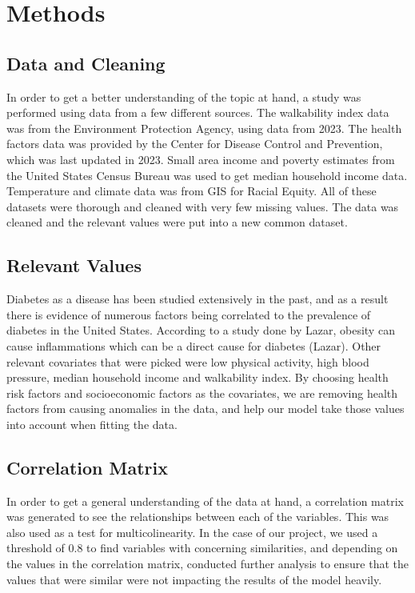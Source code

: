 \documentclass[
]{article}
\begin{document}
\section{Methods}\label{methods}

\subsection{Data and Cleaning}\label{data-and-cleaning}

In order to get a better understanding of the topic at hand, a study was
performed using data from a few different sources. The walkability index
data was from the Environment Protection Agency, using data from 2023.
The health factors data was provided by the Center for Disease Control
and Prevention, which was last updated in 2023. Small area income and
poverty estimates from the United States Census Bureau was used to get
median household income data. Temperature and climate data was from GIS
for Racial Equity. All of these datasets were thorough and cleaned with
very few missing values. The data was cleaned and the relevant values
were put into a new common dataset.

\subsection{Relevant Values}\label{relevant-values}

Diabetes as a disease has been studied extensively in the past, and as a
result there is evidence of numerous factors being correlated to the
prevalence of diabetes in the United States. According to a study done
by Lazar, obesity can cause inflammations which can be a direct cause
for diabetes (Lazar). Other relevant covariates that were picked were
low physical activity, high blood pressure, median household income and
walkability index. By choosing health risk factors and socioeconomic
factors as the covariates, we are removing health factors from causing
anomalies in the data, and help our model take those values into account
when fitting the data.

\subsection{Correlation Matrix}\label{correlation-matrix}

In order to get a general understanding of the data at hand, a
correlation matrix was generated to see the relationships between each
of the variables. This was also used as a test for multicolinearity. In
the case of our project, we used a threshold of 0.8 to find variables
with concerning similarities, and depending on the values in the
correlation matrix, conducted further analysis to ensure that the values
that were similar were not impacting the results of the model heavily.
\end{document}
